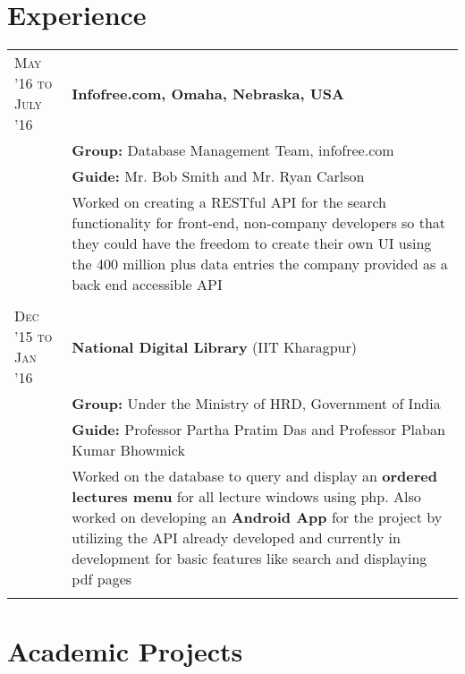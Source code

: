 \documentclass[a4paper,10pt]{extarticle} %
\begin{document}
\section{Experience}

\begin{tabular}{R{3.0cm}|p{15.0cm}}
\textsc{May '16 to July '16} & \textbf{Infofree.com, Omaha, Nebraska, USA} \\
 & \textbf{Group: }\textmd{Database Management Team}, infofree.com\\
 & \textbf{Guide: }\textmd{Mr. Bob Smith} and \textmd{Mr. Ryan Carlson}\\
& \textmd{Worked on creating a RESTful API for the search functionality for front-end, non-company developers so that they could have the freedom to create their own UI using the 400 million plus data entries the company provided as a back end accessible API}\\
 \\
\textsc{Dec '15 to Jan '16} & \textbf{National Digital Library} \textmd{(IIT Kharagpur)} \\
 & \textbf{Group: }\textmd{Under the Ministry of HRD}, Government of India\\
& \textbf{Guide: }\textmd{Professor Partha Pratim Das} and \textmd{Professor Plaban Kumar Bhowmick}\\
& \textmd{Worked on the database to query and display an \textbf{ordered lectures menu} for all lecture windows using php. Also worked on developing an \textbf{Android App} for the project by utilizing the API already developed and currently in development for basic features like search and displaying pdf pages}\\
 \\


\end{tabular}


\section{Academic Projects}
\end{document}
